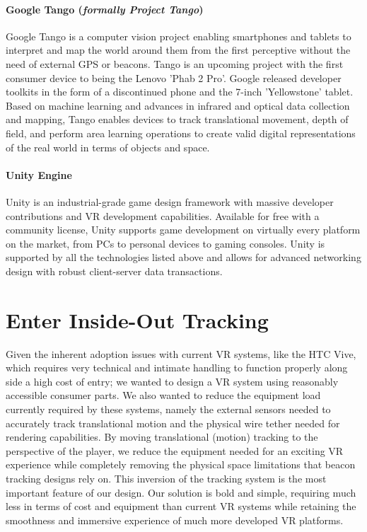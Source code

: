\documentclass{report}
\begin{document}
	\paragraph*{Google Tango (\textit{formally Project Tango})}
	Google Tango is a computer vision project enabling smartphones and tablets to interpret and map the world around them from the first perceptive without the need of external GPS or beacons. Tango is an upcoming project with the first consumer device to being the Lenovo 'Phab 2 Pro'. Google released developer toolkits in the form of a discontinued phone and the 7-inch 'Yellowstone' tablet. Based on machine learning and advances in infrared and optical data collection and mapping, Tango enables devices to track translational movement, depth of field, and perform area learning operations to create valid digital representations of the real world in terms of objects and space.
	
	\paragraph*{Unity Engine}
	Unity is an industrial-grade game design framework with massive developer contributions and VR development capabilities. Available for free with a community license, Unity supports game development on virtually every platform on the market, from PCs to personal devices to gaming consoles. Unity is supported by all the technologies listed above and allows for advanced networking design with robust client-server data transactions.
	
	\section*{Enter Inside-Out Tracking}
	Given the inherent adoption issues with current VR systems, like the HTC Vive, which requires very technical and intimate handling to function properly along side a high cost of entry; we wanted to design a VR system using reasonably accessible consumer parts. We also wanted to reduce the equipment load currently required by these systems, namely the external sensors needed to accurately track translational motion and the physical wire tether needed for rendering capabilities. By moving translational (motion) tracking to the perspective of the player, we reduce the equipment needed for an exciting VR experience while completely removing the physical space limitations that beacon tracking designs rely on. This inversion of the tracking system is the most important feature of our design.  Our solution is bold and simple, requiring much less in terms of cost and equipment than current VR systems while retaining the smoothness and immersive experience of much more developed VR platforms.
	
\end{document}
